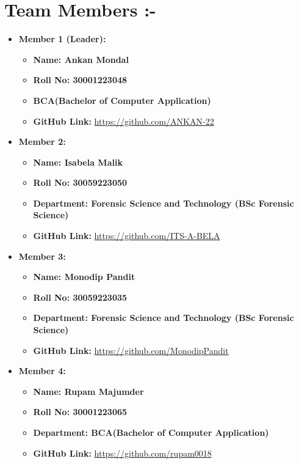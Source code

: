 \documentclass[a4paper,15pt]{article}
\begin{document}
\section*{Team Members :-}
\begin{itemize}[leftmargin=1.5cm]
    \item \textbf{Member 1 (Leader):} 
    \begin{itemize}[leftmargin=1.5cm]
        \item \textbf{Name: Ankan Mondal} 
        \item \textbf{Roll No: 30001223048 }
        \item \textbf{BCA(Bachelor of Computer Application)} 
        \item \textbf{GitHub Link:} \url{https://github.com/ANKAN-22}
\end{itemize}

\item \textbf{Member 2:} 
    \begin{itemize}[leftmargin=1.5cm]
        \item \textbf{Name: Isabela Malik  } 
        \item \textbf{Roll No: 30059223050} 
        \item \textbf{Department: Forensic Science and Technology (BSc Forensic Science) } 
        \item \textbf{GitHub Link:} \url{https://github.com/ITS-A-BELA}
    \end{itemize}

    \item \textbf{Member 3:} 
    \begin{itemize}[leftmargin=1.5cm]
        \item \textbf{Name: Monodip Pandit } 
        \item \textbf{Roll No: 30059223035  } 
        \item \textbf{Department:  Forensic Science and Technology (BSc Forensic Science) } 
        \item \textbf{GitHub Link:} \url{https://github.com/MonodipPandit}
    \end{itemize}

    \item \textbf{Member 4:} 
    \begin{itemize}[leftmargin=1.5cm]
        \item \textbf{Name: Rupam Majumder } 
        \item \textbf{Roll No: 30001223065 } 
        \item \textbf{Department: BCA(Bachelor of Computer Application) } 
        \item \textbf{GitHub Link:} \url{https://github.com/rupam0018}
    \end{itemize}


\end{itemize}
\end{document}
